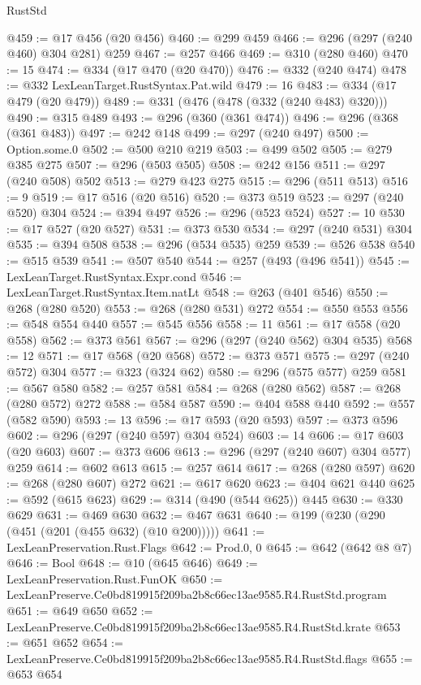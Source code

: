 \begin{lexlean}{RustStd}
\begin{coremodule}
@459 := @17 @456 (@20 @456)
@460 := @299 @459
@466 := @296 (@297 (@240 @460) @304 @281) @259
@467 := @257 @466
@469 := @310 (@280 @460)
@470 := 15
@474 := @334 (@17 @470 (@20 @470))
@476 := @332 (@240 @474)
@478 := @332 LexLeanTarget.RustSyntax.Pat.wild
@479 := 16
@483 := @334 (@17 @479 (@20 @479))
@489 := @331 (@476 (@478 (@332 (@240 @483) @320)))
@490 := @315 @489
@493 := @296 (@360 (@361 @474))
@496 := @296 (@368 (@361 @483))
@497 := @242 @148
@499 := @297 (@240 @497)
@500 := Option.some.{0}
@502 := @500 @210 @219
@503 := @499 @502
@505 := @279 @385 @275
@507 := @296 (@503 @505)
@508 := @242 @156
@511 := @297 (@240 @508) @502
@513 := @279 @423 @275
@515 := @296 (@511 @513)
@516 := 9
@519 := @17 @516 (@20 @516)
@520 := @373 @519
@523 := @297 (@240 @520) @304
@524 := @394 @497
@526 := @296 (@523 @524)
@527 := 10
@530 := @17 @527 (@20 @527)
@531 := @373 @530
@534 := @297 (@240 @531) @304
@535 := @394 @508
@538 := @296 (@534 @535) @259
@539 := @526 @538
@540 := @515 @539
@541 := @507 @540
@544 := @257 (@493 (@496 @541))
@545 := LexLeanTarget.RustSyntax.Expr.cond
@546 := LexLeanTarget.RustSyntax.Item.natLt
@548 := @263 (@401 @546)
@550 := @268 (@280 @520)
@553 := @268 (@280 @531) @272
@554 := @550 @553
@556 := @548 @554 @440
@557 := @545 @556
@558 := 11
@561 := @17 @558 (@20 @558)
@562 := @373 @561
@567 := @296 (@297 (@240 @562) @304 @535)
@568 := 12
@571 := @17 @568 (@20 @568)
@572 := @373 @571
@575 := @297 (@240 @572) @304
@577 := @323 (@324 @62)
@580 := @296 (@575 @577) @259
@581 := @567 @580
@582 := @257 @581
@584 := @268 (@280 @562)
@587 := @268 (@280 @572) @272
@588 := @584 @587
@590 := @404 @588 @440
@592 := @557 (@582 @590)
@593 := 13
@596 := @17 @593 (@20 @593)
@597 := @373 @596
@602 := @296 (@297 (@240 @597) @304 @524)
@603 := 14
@606 := @17 @603 (@20 @603)
@607 := @373 @606
@613 := @296 (@297 (@240 @607) @304 @577) @259
@614 := @602 @613
@615 := @257 @614
@617 := @268 (@280 @597)
@620 := @268 (@280 @607) @272
@621 := @617 @620
@623 := @404 @621 @440
@625 := @592 (@615 @623)
@629 := @314 (@490 (@544 @625)) @445
@630 := @330 @629
@631 := @469 @630
@632 := @467 @631
@640 := @199 (@230 (@290 (@451 (@201 (@455 @632) (@10 @200)))))
@641 := LexLeanPreservation.Rust.Flags
@642 := Prod.{0, 0}
@645 := @642 (@642 @8 @7)
@646 := Bool
@648 := @10 (@645 @646)
@649 := LexLeanPreservation.Rust.FunOK
@650 := LexLeanPreserve.Ce0bd819915f209ba2b8c66ec13ae9585.R4.RustStd.program
@651 := @649 @650
@652 := LexLeanPreserve.Ce0bd819915f209ba2b8c66ec13ae9585.R4.RustStd.krate
@653 := @651 @652
@654 := LexLeanPreserve.Ce0bd819915f209ba2b8c66ec13ae9585.R4.RustStd.flags
@655 := @653 @654

\end{coremodule}
\end{lexlean}
